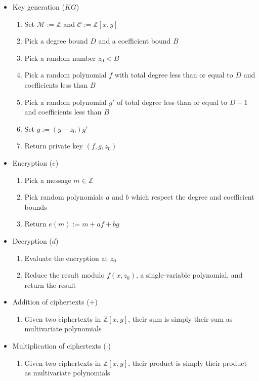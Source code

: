\documentclass[11pt]{report}
\newcommand{\Z}{\mathbb{Z}}
\newcommand{\M}{\mathcal{M}}
\newcommand{\Zxy}{\mathbb{Z}[x,y]}
\begin{document}
\begin{itemize}
\item Key generation ($KG$)
\begin{enumerate}
\item Set $\M := \Z$ and $\mathcal{C} := \Zxy$
\item Pick a degree bound $D$ and a coefficient bound $B$
\item Pick a random number $z_0 < B$
\item Pick a random polynomial $f$ with total degree less than or equal to $D$ and coefficients less than $B$
\item Pick a random polynomial $g'$ of total degree less than or equal to $D-1$ and coefficients less than $B$
\item Set $g := (y-z_0)g'$
\item Return private key $(f,g,z_0)$
\end{enumerate}

\item Encryption ($e$)
\begin{enumerate}
\item Pick a message $m\in \Z$
\item Pick random polynomials $a$ and $b$ which respect the degree and coefficient bounds
\item Return $e(m) := m+af+bg$
\end{enumerate}

\item Decryption ($d$)
\begin{enumerate}
\item Evaluate the encryption at $z_0$
\item Reduce the result modulo $f(x,z_0)$, a single-variable polynomial, and return the result
\end{enumerate}

\item Addition of ciphertexts ($+$)
\begin{enumerate}
\item Given two ciphertexts in $\Zxy$, their sum is simply their sum as multivariate polynomials
\end{enumerate}

\item Multiplication of ciphertexts ($\cdot$)
\begin{enumerate}
\item Given two ciphertexts in $\Zxy$, their product is simply their product as multivariate polynomials
\end{enumerate}
\end{itemize}
\end{document}
